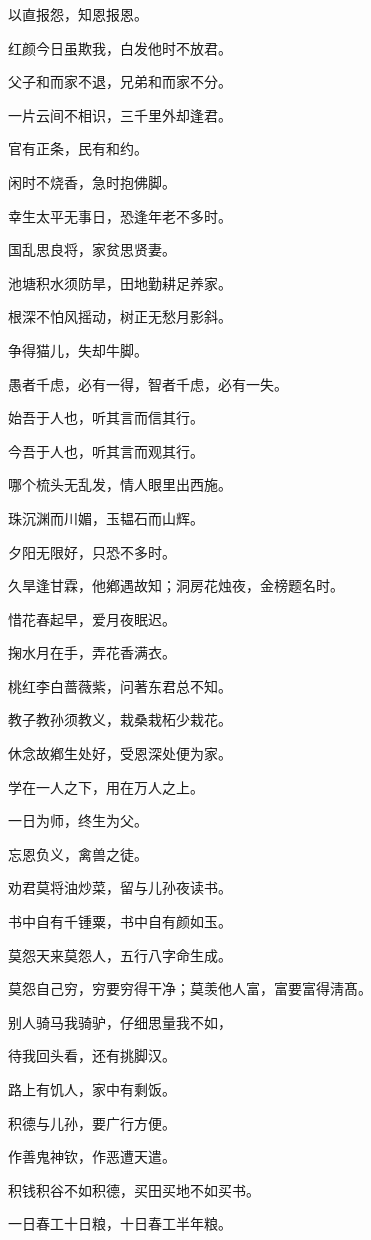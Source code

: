 \documentclass[12pt,oneside]{book}
\begin{document}
以直报怨，知恩报恩。

红颜今日虽欺我，白发他时不放君。

父子和而家不退，兄弟和而家不分。

一片云间不相识，三千里外却逢君。

官有正条，民有和约。

闲时不烧香，急时抱佛脚。

幸生太平无事日，恐逢年老不多时。

国乱思良将，家贫思贤妻。

池塘积水须防旱，田地勤耕足养家。

根深不怕风摇动，树正无愁月影斜。

争得猫儿，失却牛脚。

愚者千虑，必有一得，智者千虑，必有一失。

始吾于人也，听其言而信其行。

今吾于人也，听其言而观其行。

哪个梳头无乱发，情人眼里出西施。

珠沉渊而川媚，玉韫石而山辉。

夕阳无限好，只恐不多时。

久旱逢甘霖，他鄕遇故知；洞房花烛夜，金榜题名时。

惜花春起早，爱月夜眠迟。

掬水月在手，弄花香满衣。

桃红李白蔷薇紫，问著东君总不知。

教子教孙须教义，栽桑栽柘少栽花。

休念故鄕生处好，受恩深处便为家。

学在一人之下，用在万人之上。

一日为师，终生为父。

忘恩负义，禽兽之徒。

劝君莫将油炒菜，留与儿孙夜读书。

书中自有千锺粟，书中自有颜如玉。

莫怨天来莫怨人，五行八字命生成。

莫怨自己穷，穷要穷得干净；莫羡他人富，富要富得淸髙。

别人骑马我骑驴，仔细思量我不如，

待我回头看，还有挑脚汉。

路上有饥人，家中有剩饭。

积德与儿孙，要广行方便。

作善鬼神钦，作恶遭天遣。

积钱积谷不如积德，买田买地不如买书。

一日春工十日粮，十日春工半年粮。
\end{document}
